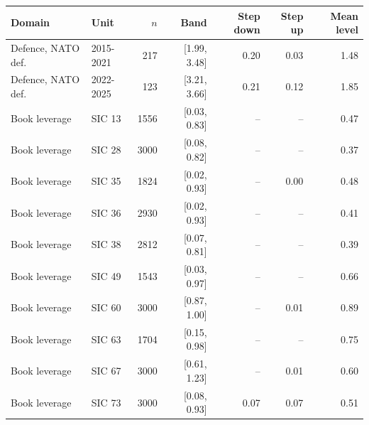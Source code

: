 \begin{tabular}{llrrrrr}\toprule
Domain & Unit & $n$ & Band & Step down & Step up & Mean level\\\midrule
Defence, NATO def. & 2015-2021 & 217 & [1.99, 3.48] & 0.20 & 0.03 & 1.48\\
Defence, NATO def. & 2022-2025 & 123 & [3.21, 3.66] & 0.21 & 0.12 & 1.85\\
Book leverage & SIC 13 & 1556 & [0.03, 0.83] & -- & -- & 0.47\\
Book leverage & SIC 28 & 3000 & [0.08, 0.82] & -- & -- & 0.37\\
Book leverage & SIC 35 & 1824 & [0.02, 0.93] & -- & 0.00 & 0.48\\
Book leverage & SIC 36 & 2930 & [0.02, 0.93] & -- & -- & 0.41\\
Book leverage & SIC 38 & 2812 & [0.07, 0.81] & -- & -- & 0.39\\
Book leverage & SIC 49 & 1543 & [0.03, 0.97] & -- & -- & 0.66\\
Book leverage & SIC 60 & 3000 & [0.87, 1.00] & -- & 0.01 & 0.89\\
Book leverage & SIC 63 & 1704 & [0.15, 0.98] & -- & -- & 0.75\\
Book leverage & SIC 67 & 3000 & [0.61, 1.23] & -- & 0.01 & 0.60\\
Book leverage & SIC 73 & 3000 & [0.08, 0.93] & 0.07 & 0.07 & 0.51\\
\bottomrule\end{tabular}